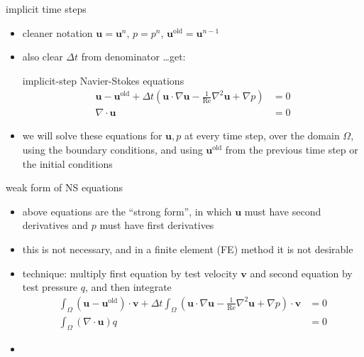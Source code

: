 \documentclass[10pt,hyperref]{beamer}
\newcommand{\bv}{\mathbf{v}}
\newcommand{\bu}{\mathbf{u}}
\newcommand{\grad}{\nabla}
\newcommand{\Div}{\nabla\cdot}
\renewcommand{\Re}{\text{Re}}
\newcommand{\buold}{\bu^{\text{old}}}
\begin{document}
\begin{frame}{implicit time steps}

\begin{itemize}
\item cleaner notation $\bu=\bu^n$, $p=p^n$, $\buold = \bu^{n-1}$
\item also clear $\Delta t$ from denominator \dots get:

\begin{block}{implicit-step Navier-Stokes equations}
\begin{align*}
\bu - \buold + \Delta t \left(\bu \cdot \grad \bu - \frac{1}{\Re}\grad^2 \bu + \grad p\right) &= 0 \\
\Div \bu &= 0
\end{align*}
\end{block}

\item we will solve these equations for $\bu,p$ \alert{at every time step}, over the domain $\Omega$, using the boundary conditions, and using $\buold$ from the previous time step or the initial conditions
\end{itemize}
\end{frame}


\begin{frame}{weak form of NS equations}

\begin{itemize}
\item above equations are the ``strong form'', in which $\bu$ must have second derivatives and $p$ must have first derivatives
\item this is not necessary, and in a finite element (FE) method it is not desirable
\item technique: multiply first equation by test velocity $\bv$ and second equation by test pressure $q$, and then integrate
\begin{align*}
\int_\Omega (\bu - \buold)\cdot \bv + \Delta t \int_\Omega \left(\bu \cdot \grad \bu - \frac{1}{\Re}\grad^2 \bu + \grad p\right) \cdot \bv &= 0 \\
\int_\Omega (\Div \bu) q &= 0
\end{align*}
\end{itemize}
\end{frame}

\begin{frame}{}

\begin{itemize}
\item 
\end{itemize}
\end{frame}
\end{document}
